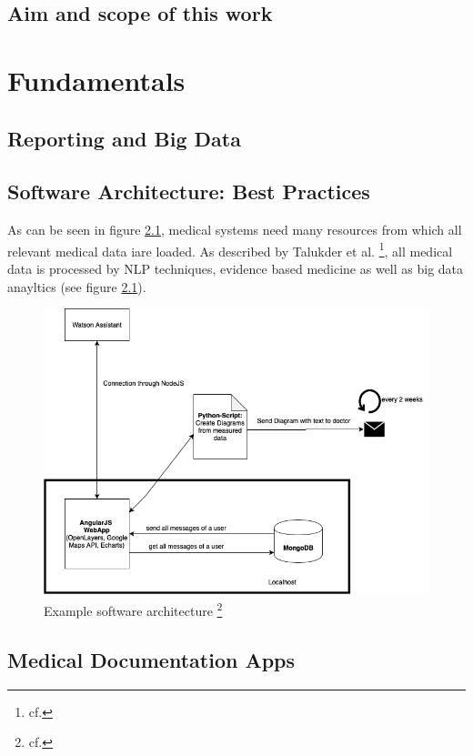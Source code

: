 \section{Aim and scope of this work}

\chapter{Fundamentals}\label{fundamentals}

\section{Reporting and Big Data}
\section{Software Architecture: Best Practices}

As can be seen in figure \ref{example_software_architecture}, medical systems need many resources from which all relevant medical data iare loaded. As described by Talukder et al. \footnote{cf.\autocite{talukder}}, all medical data is processed by \ac{NLP} techniques, evidence based medicine as well as big data anayltics (see figure \ref{example_software_architecture}).

\begin{figure}[htbp]
	\centering
	\includegraphics[width=1\textwidth]{images/components.png}
	\caption{Example software architecture \footnote{cf.\autocite{talukder}}}
	\label{example_software_architecture}
\end{figure}
\section{Medical Documentation Apps}

